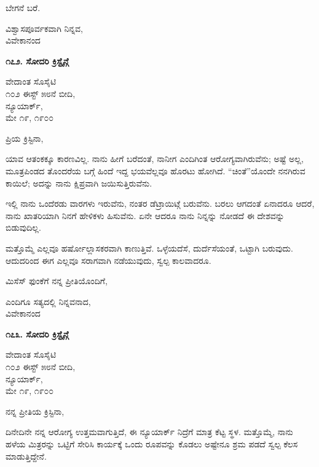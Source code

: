 ಬೇಗನೆ ಬರೆ.

\begin{flushright}
ವಿಶ್ವಾಸಪೂರ್ವಕವಾಗಿ ನಿನ್ನವ,\\ವಿವೇಕಾನಂದ
\end{flushright}

\begin{center}
\textbf{೧೭೨. ಸೋದರಿ ಕ್ರಿಸ್ಟೈನ್ಗೆ}
\end{center}

\begin{flushright}
ವೇದಾಂತ ಸೊಸೈಟಿ\\೧೦೨ ಈಸ್ಟ್ ೫೮ನೆ ಬೀದಿ,\\ನ್ಯೂಯಾರ್ಕ್,\\ಮೇ ೧೯, ೧೯೦೦
\end{flushright}

ಪ್ರಿಯ ಕ್ರಿಸ್ಟಿನಾ,

ಯಾವ ಆತಂಕಕ್ಕೂ ಕಾರಣವಿಲ್ಲ. ನಾನು ಹೀಗೆ ಬರೆದಂತೆ, ನಾನೀಗ ಎಂದಿಗಿಂತ ಆರೋಗ್ಯವಾಗಿರುವೆನು; ಅಷ್ಟೆ ಅಲ್ಲ, ಮೂತ್ರಪಿಂಡದ ತೊಂದರೆಯ ಬಗ್ಗೆ ಹಿಂದೆ ಇದ್ದ ಭಯವೆಲ್ಲವೂ ಹೊರಟು ಹೋಗಿದೆ. “ಚಿಂತೆ”ಯೊಂದೇ ನನಗಿರುವ ಕಾಯಿಲೆ; ಅದನ್ನು ನಾನು ಕ್ಷಿಪ್ರವಾಗಿ ಜಯಿಸುತ್ತಿರುವೆನು.

ಇಲ್ಲಿ ನಾನು ಒಂದೆರಡು ವಾರಗಳು ಇರುವೆನು, ನಂತರ ಡೆಟ್ರಾಯಿಟ್ಗೆ ಬರುವೆನು. ಬರಲು ಆಗದಂತೆ ಏನಾದರೂ ಆದರೆ, ನಾನು ಖಾತರಿಯಾಗಿ ನಿನಗೆ ಹೇಳಿಕಳು ಹಿಸುವೆನು. ಏನೇ ಆದರೂ ನಾನು ನಿನ್ನನ್ನು ನೋಡದೆ ಈ ದೇಶವನ್ನು ಬಿಡುವುದಿಲ್ಲ.

ಮತ್ತೊಮ್ಮೆ ಎಲ್ಲವೂ ಹರ್ಷೋಲ್ಲಾಸಕರವಾಗಿ ಕಾಣುತ್ತಿವೆ. ಒಳ್ಳೆಯದೆಸೆ, ದುರ್ದೆಸೆಯಂತೆ, ಒಟ್ಟಾಗಿ ಬರುವುದು. ಆದುದರಿಂದ ಈಗ ಎಲ್ಲವೂ ಸರಾಗವಾಗಿ ನಡೆಯುವುದು, ಸ್ವಲ್ಪ ಕಾಲವಾದರೂ.

ಮಿಸೆಸ್ ಫುಂಕೆಗೆ ನನ್ನ ಪ್ರೀತಿಯೊಂದಿಗೆ,

\begin{flushright}
ಎಂದಿಗೂ ಸತ್ಯದಲ್ಲಿ ನಿನ್ನವನಾದ,\\ವಿವೇಕಾನಂದ
\end{flushright}

\begin{center}
\textbf{೧೭೩. ಸೋದರಿ ಕ್ರಿಸ್ಟೈನ್ಗೆ}
\end{center}

\begin{flushright}
ವೇದಾಂತ ಸೊಸೈಟಿ\\೧೦೨ ಈಸ್ಟ್ ೫೮ನೆ ಬೀದಿ,\\ನ್ಯೂಯಾರ್ಕ್,\\ಮೇ ೧೯, ೧೯೦೦
\end{flushright}

ನನ್ನ ಪ್ರೀತಿಯ ಕ್ರಿಸ್ಟಿನಾ,

ದಿನೇದಿನೇ ನನ್ನ ಆರೋಗ್ಯ ಉತ್ತಮವಾಗುತ್ತಿದೆ, ಈ ನ್ಯೂಯಾರ್ಕ್ ನಿದ್ರೆಗೆ ಮಾತ್ರ ಕೆಟ್ಟ ಸ್ಥಳ. ಮತ್ತೊಮ್ಮೆ, ನಾನು ಹಳೆಯ ಮಿತ್ರರನ್ನು ಒಟ್ಟಿಗೆ ಸೇರಿಸಿ ಕಾರ್ಯಕ್ಕೆ ಒಂದು ರೂಪವನ್ನು ಕೊಡಲು ಅಷ್ಟೇನೂ ಶ್ರಮ ಪಡದೆ ಸ್ವಲ್ಪ ಕೆಲಸ ಮಾಡುತ್ತಿದ್ದೇನೆ.

